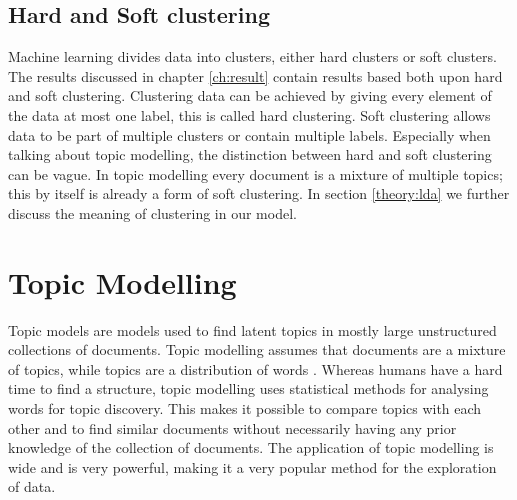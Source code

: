 \subsection{Hard and Soft clustering}
Machine learning divides data into clusters, either hard clusters or soft clusters. The results discussed in chapter \ref{ch:result} contain results based both upon hard and soft clustering. Clustering data can be achieved by giving every element of the data at most one label, this is called hard clustering. Soft clustering allows data to be part of multiple clusters or contain multiple labels. Especially when talking about topic modelling, the distinction between hard and soft clustering can be vague. In topic modelling every document is a mixture of multiple topics; this by itself is already a form of soft clustering. In section \ref{theory:lda} we further discuss the meaning of clustering in our model.

\section{Topic Modelling}\label{theory:tm}
Topic models are models used to find latent topics in mostly large unstructured collections of documents. Topic modelling assumes that documents are a mixture of topics, while topics are a distribution of words \cite{Blei2010}. Whereas humans have a hard time to find a structure, topic modelling uses statistical methods for analysing words for topic discovery. This makes it possible to compare topics with each other and to find similar documents without necessarily having any prior knowledge of the collection of documents. The application of topic modelling is wide and is very powerful, making it a very popular method for the exploration of data. 


